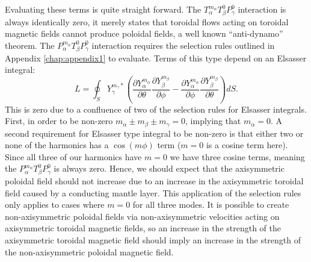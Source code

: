 Evaluating these terms is quite straight forward. The $T_{\alpha}^{m_{\alpha}} T_{\beta}^{0} P_{\gamma}^{0}$ interaction is always identically zero, it merely states that toroidal flows acting on toroidal magnetic fields cannot produce poloidal fields, a well known ``anti-dynamo'' theorem. The $P_{\alpha}^{m_{\alpha}} T_{\beta}^{0} P_{\gamma}^{0}$ interaction requires the selection rules outlined in Appendix \ref{chap:appendix1} to evaluate. Terms of this type depend on an Elsasser integral:
\begin{equation}
L=\oint_{S}Y_{\gamma}^{m_{\gamma}*}\left(\frac{\partial Y_{\alpha}^{m_\alpha}}{\partial \theta}\frac{\partial Y_{\beta}^{m_\beta}}{\partial \phi}-\frac{\partial Y_{\alpha}^{m_\alpha}}{\partial \phi}\frac{\partial Y_{\beta}^{m_\beta}}{\partial \theta}\right)dS.
\end{equation}
This is zero due to a confluence of two of the selection rules for Elsasser integrals. First, in order to be non-zero $m_\alpha\pm m_\beta \pm m_\gamma =0$, implying that $m_\alpha=0$. A second requirement for Elsasser type integral to be non-zero is that either two or none of the harmonics has a $\cos\left(m\phi\right)$ term ($m=0$ is a cosine term here). Since all three of our harmonics have $m=0$ we have three cosine terms, meaning the $P_{\alpha}^{m_{\alpha}} T_{\beta}^{0} P_{\gamma}^{0}$ is always zero. Hence, we should expect that the axisymmetric poloidal field should not increase due to an increase in the axisymmetric toroidal field caused by a conducting mantle layer. This application of the selection rules only applies to cases where $m=0$ for all three modes. It is possible to create non-axisymmetric poloidal fields via non-axisymmetric velocities acting on axisymmetric toroidal magnetic fields, so an increase in the strength of the axisymmetric toroidal magnetic field should imply an increase in the strength of the non-axisymmetric poloidal magnetic field. 

